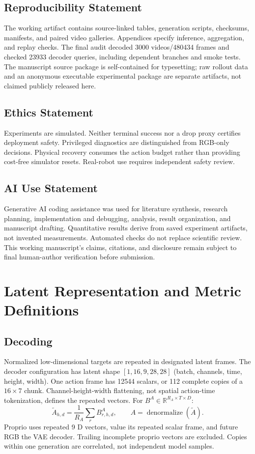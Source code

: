 \documentclass{article}
\newcommand{\R}{\mathbb{R}}
\begin{document}
\subsection*{Reproducibility Statement}
The working artifact contains source-linked tables, generation scripts,
checksums, manifests, and paired video galleries. Appendices specify inference,
aggregation, and replay checks. The final audit decoded 3000 videos/480434 frames
and checked 23933 decoder queries, including dependent branches and smoke tests.
The manuscript source package is self-contained for typesetting; raw rollout
data and an anonymous executable experimental package are separate artifacts,
not claimed publicly released here.

\subsection*{Ethics Statement}
Experiments are simulated. Neither terminal success nor a drop proxy certifies
deployment safety. Privileged diagnostics are distinguished from RGB-only
decisions. Physical recovery consumes the action budget rather than providing
cost-free simulator resets. Real-robot use requires independent safety review.

\subsection*{AI Use Statement}
Generative AI coding assistance was used for literature synthesis, research
planning, implementation and debugging, analysis, result organization, and
manuscript drafting. Quantitative results derive from saved experiment
artifacts, not invented measurements. Automated checks do not replace
scientific review. This working manuscript's claims, citations, and disclosure
remain subject to final human-author verification before submission.



\clearpage
\appendix

\section{Latent Representation and Metric Definitions}
\label{app:metrics}
\subsection{Decoding}
Normalized low-dimensional targets are repeated in designated latent frames.
The decoder configuration has latent shape $[1,16,9,28,28]$
(batch, channels, time, height, width). One action frame has 12544 scalars,
or 112 complete copies of a $16\times7$ chunk. Channel-height-width flattening,
not spatial action-time tokenization, defines the repeated vectors.
For $B^A\in\R^{R_A\times T\times D}$:
\begin{equation}
\widetilde A_{h,d}=\frac1{R_A}\sum_rB^A_{r,h,d},\qquad
A=\operatorname{denormalize}(\widetilde A).
\end{equation}
Proprio uses repeated 9 D vectors, value its repeated scalar frame, and future
RGB the VAE decoder. Trailing incomplete proprio vectors are excluded.
Copies within one generation are correlated, not independent model samples.
\end{document}
